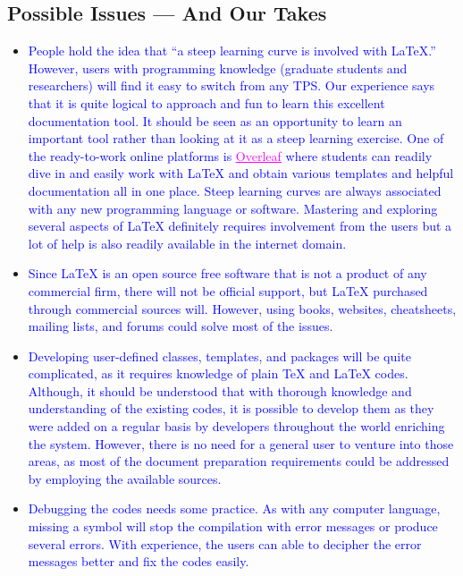 \documentclass[phd]{ndsu-thesis-2022}
\newcommand\italk[1]{\textcolor{blue}{#1}}  %
\newcommand\lx{\LaTeX\xspace}
\newcommand\tx{\TeX\xspace}
\begin{document}
\subsection{Possible Issues --- And Our Takes}
\begin{itemize}[leftmargin=*, itemsep=0pt, parsep=3pt] 
\item \italk{People hold the idea that ``a steep learning curve is involved with \lx.'' However, users with programming knowledge (graduate students and researchers) will find it easy to switch from any TPS. Our experience says that it is quite logical to approach and fun to learn this excellent documentation tool. It should be seen as an opportunity to learn an important tool rather than looking at it as a steep learning exercise. One of the ready-to-work online platforms is \href{https://www.overleaf.com/login}{\textcolor{magenta}{\underline{Overleaf}}} where students can readily dive in and easily work with \lx and obtain various templates and helpful documentation all in one place. Steep learning curves are always associated with any new programming language or software. Mastering and exploring several aspects of \lx definitely requires involvement from the users but a lot of help is also readily available in the internet domain.}   

\item \italk{Since \lx is an open source free software that is not a product of any commercial firm, there will not be official support, but \lx purchased through commercial sources will. However, using books, websites, cheatsheets, mailing lists, and forums could solve most of the issues.} 

\item \italk{Developing user-defined classes, templates, and packages will be quite complicated, as it requires knowledge of plain \tx and \lx codes. Although, it should be understood that with thorough knowledge and understanding of the existing codes, it is possible to develop them as they were added on a regular basis by developers throughout the world enriching the system. However, there is no need for a general user to venture into those areas, as most of the document preparation requirements could be addressed by employing the available sources.} 

\item \italk{Debugging the codes needs some practice. As with any computer language, missing a symbol will stop the compilation with error messages or produce several errors. With experience, the users can able to decipher the error messages better and fix the codes easily.}  


\end{itemize}
\end{document}
